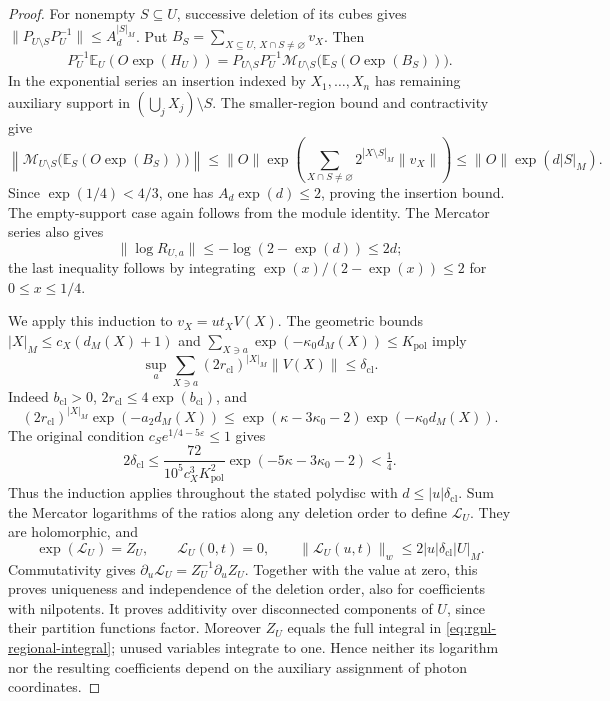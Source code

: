 \begin{proof}
For nonempty $S\subseteq U$, successive deletion of its cubes gives
$\|P_{U\setminus S}P_U^{-1}\|\le A_d^{|S|_M}$.
Put $B_S=\sum_{X\subseteq U,\,X\cap S\ne\varnothing}v_X$. Then
\[
 P_U^{-1}\mathbb E_U(O\exp(H_U))
 =P_{U\setminus S}P_U^{-1}
       \mathcal M_{U\setminus S}\bigl(\mathbb E_S(O\exp(B_S))\bigr).
\]
In the exponential series an insertion indexed by $X_1,\ldots,X_n$
has remaining auxiliary support in $(\bigcup_jX_j)\setminus S$.
The smaller-region bound and contractivity give
\[
 \left\|\mathcal M_{U\setminus S}
                \bigl(\mathbb E_S(O\exp(B_S))\bigr)\right\|
 \le\|O\|\exp\left(\sum_{X\cap S\ne\varnothing}
                          2^{|X\setminus S|_M}\|v_X\|\right)
 \le\|O\|\exp(d|S|_M).
\]
Since $\exp(1/4)<4/3$, one has $A_d\exp(d)\le2$, proving the
insertion bound. The empty-support case again follows from the
module identity. The Mercator series also gives
\[
 \|\log R_{U,a}\|\le-\log(2-\exp(d))\le2d;
\]
the last inequality follows by integrating
$\exp(x)/(2-\exp(x))\le2$ for $0\le x\le1/4$.

We apply this induction to $v_X=ut_XV(X)$. The geometric
bounds $|X|_M\le c_X(d_M(X)+1)$ and
$\sum_{X\ni a}\exp(-\kappa_0d_M(X))\le K_{\mathrm{pol}}$ imply
\[
 \sup_a\sum_{X\ni a}(2r_{\mathrm{cl}})^{|X|_M}
                           \|V(X)\|\le\delta_{\mathrm{cl}}.
\]
Indeed $b_{\mathrm{cl}}>0$, $2r_{\mathrm{cl}}\le4\exp(b_{\mathrm{cl}})$,
and
\[
 (2r_{\mathrm{cl}})^{|X|_M}\exp(-a_2d_M(X))
 \le \exp(\kappa-3\kappa_0-2)\exp(-\kappa_0d_M(X)).
\]
The original condition $c_Se^{1/4-5\varepsilon}\le1$ gives
\begin{equation}\label{eq:rgnl-cluster-smallness}
 2\delta_{\mathrm{cl}}
 \le\frac{72}{10^5c_X^3K_{\mathrm{pol}}^2}
                       \exp(-5\kappa-3\kappa_0-2)<\tfrac14.
\end{equation}
Thus the induction applies throughout the stated polydisc with
$d\le|u|\delta_{\mathrm{cl}}$.
Sum the Mercator logarithms of the ratios along any deletion
order to define $\mathcal L_U$. They are holomorphic, and
\[
 \exp(\mathcal L_U)=Z_U,\qquad \mathcal L_U(0,t)=0,\qquad
 \|\mathcal L_U(u,t)\|_w\le2|u|\delta_{\mathrm{cl}}|U|_M.
\]
Commutativity gives
$\partial_u\mathcal L_U=Z_U^{-1}\partial_uZ_U$.
Together with the value at zero, this proves uniqueness and
independence of the deletion order, also for coefficients with
nilpotents. It proves additivity over disconnected components
of $U$, since their partition functions factor. Moreover
$Z_U$ equals the full integral in \eqref{eq:rgnl-regional-integral};
unused variables integrate to one. Hence neither its logarithm
nor the resulting coefficients depend on the auxiliary assignment
of photon coordinates.


\end{proof}
